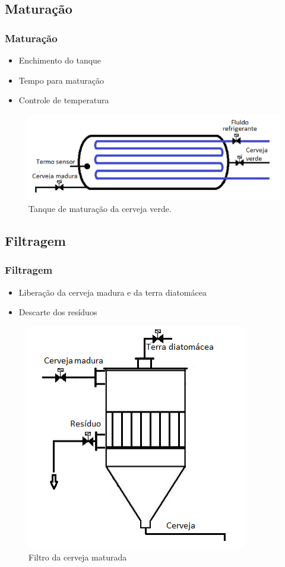 \documentclass{beamer}
\begin{document}
\subsection{Maturação}
\begin{frame}
\frametitle{Maturação}
\begin{itemize}
	\item Enchimento do tanque
	\item Tempo para maturação
	\item Controle de temperatura
\end{itemize}


	\begin{figure}[H]
		\centering
		\includegraphics [width=0.5\linewidth]{tanque.png}
		\caption {Tanque de maturação da cerveja verde.}
		\label{fig:maturador}
	\end{figure}
\end{frame}
\subsection{Filtragem}
\begin{frame}
	\frametitle{Filtragem}
	\begin{itemize}
		\item Liberação da cerveja madura e da terra diatomácea
		\item Descarte dos resíduos
	\end{itemize}
	
	
	\begin{figure}[H]
		\centering
		\includegraphics [width=0.3\linewidth]{filtro.png}
		\caption {Filtro da cerveja maturada}
		\label{fig:filtro}
	\end{figure}
\end{frame}

\end{document}
